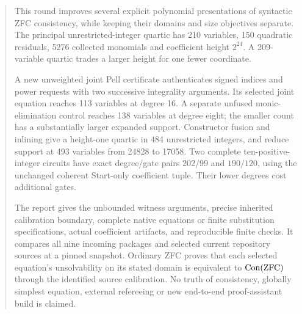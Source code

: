 \begin{abstract}
This round improves several explicit polynomial presentations of syntactic
ZFC consistency, while keeping their domains and size objectives separate.
The principal unrestricted-integer quartic has 210 variables, 150 quadratic
residuals, 5276 collected monomials and coefficient height $2^{24}$.
A 209-variable quartic trades a larger height for one fewer coordinate.

A new unweighted joint Pell certificate authenticates signed indices and
power requests with two successive integrality arguments. Its selected joint equation reaches 113 variables at degree 16. A separate
unfused monic-elimination control reaches 138 variables at degree eight;
the smaller count has a substantially larger expanded support. Constructor fusion and inlining give a height-one quartic
in 484 unrestricted integers, and reduce support at 493 variables from
24828 to 17058. Two complete ten-positive-integer circuits have exact
degree/gate pairs $202/99$ and $190/120$, using the unchanged coherent
Start-only coefficient tuple. Their lower degrees cost additional gates.

The report gives the unbounded witness arguments, precise inherited
calibration boundary, complete native equations or finite substitution
specifications, actual coefficient artifacts, and reproducible finite
checks. It compares all nine incoming packages and selected current
repository sources at a pinned snapshot. Ordinary ZFC proves that each
selected equation's unsolvability on its stated domain is equivalent to
$\Con(\mathrm{ZFC})$ through the identified source calibration. No truth of
consistency, globally simplest equation, external refereeing or new
end-to-end proof-assistant build is claimed.
\end{abstract}
